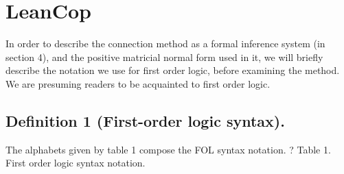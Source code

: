 \chapter{LeanCop}
\label{ch:translation}

In order to describe the connection method as a formal inference system (in section 4), and the positive matricial normal form used in it, we will briefly describe the notation we use for first order logic, before examining the method. We are presuming readers to be acquainted to first order logic.

\section{Definition 1 (First-order logic syntax).}
The alphabets given by table 1 compose the FOL syntax notation.	? Table 1. First order logic syntax notation.